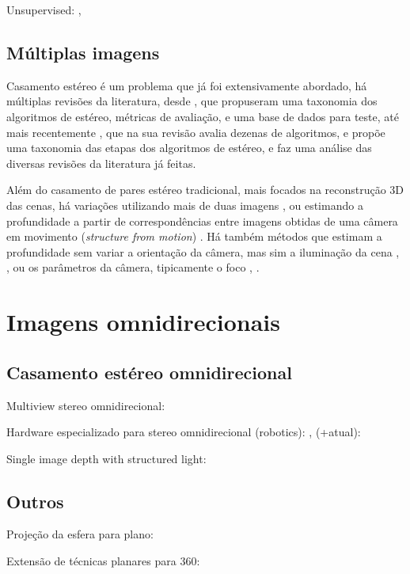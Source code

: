 \documentclass[cic,tc]{iiufrgs}
\begin{document}
Unsupervised: \citet{Godard2016}, \citet{Zhou2017}

\subsection{Múltiplas imagens}

Casamento estéreo é um problema que já foi extensivamente abordado, há múltiplas revisões da literatura, desde \citet{stereoSurvey2001}, que propuseram uma taxonomia dos algoritmos de estéreo, métricas de avaliação, e uma base de dados para teste, até mais recentemente \citet{stereoSurvey2016}, que na sua revisão avalia dezenas de algoritmos, e propõe uma taxonomia das etapas dos algoritmos de estéreo, e faz uma análise das diversas revisões da literatura já feitas.

Além do casamento de pares estéreo tradicional, mais focados na reconstrução 3D das cenas, há variações utilizando mais de duas imagens \citep{multiViewStereo2015}, ou estimando a profundidade a partir de correspondências entre imagens obtidas de uma câmera em movimento (\textit{structure from motion}) \citep{structMotion2016}. Há também métodos que estimam a profundidade sem variar a orientação da câmera, mas sim a iluminação da cena \citep{photometricStereo1989}, \citep{photometricStereo2012}, ou os parâmetros da câmera, tipicamente o foco \citep{defocus1987}, \citep{defocus2015}.


\section{Imagens omnidirecionais}

\subsection{Casamento estéreo omnidirecional}
Multiview stereo omnidirecional: \citet{Li2001}

Hardware especializado para stereo omnidirecional (robotics): \citet{gluckman1998}, \citet{Koyasu2001} (+atual): \citet{Lin2014}

Single image depth with structured light: \citet{Orghidan2005}

\subsection{Outros}
Projeção da esfera para plano: \citet{sun360}

Extensão de técnicas planares para 360: \citet{flat2sphere}
\end{document}
